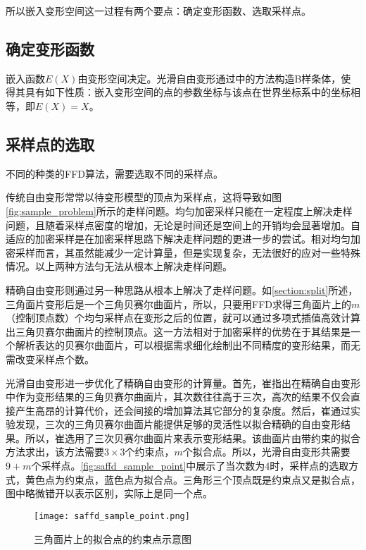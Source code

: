 所以嵌入变形空间这一过程有两个要点：确定变形函数、选取采样点。

\subsection{确定变形函数}
嵌入函数$E(X)$由变形空间决定。光滑自由变形通过\cite{Feng02}中的方法构造B样条体，使得其具有如下性质：嵌入变形空间的点的参数坐标与该点在世界坐标系中的坐标相等，即$E(X)=X$。

\subsection{采样点的选取}
不同的种类的FFD算法，需要选取不同的采样点。

传统自由变形常常以待变形模型的顶点为采样点，这将导致如图\autoref{fig:sample_problem}所示的走样问题。均匀加密采样只能在一定程度上解决走样问题，且随着采样点密度的增加，无论是时间还是空间上的开销均会显著增加。自适应的加密采样是在加密采样思路下解决走样问题的更进一步的尝试。相对均匀加密采样而言，其虽然能减少一定计算量，但是实现复杂，无法很好的应对一些特殊情况。以上两种方法匀无法从根本上解决走样问题。

精确自由变形\cite{Feng00}则通过另一种思路从根本上解决了走样问题。如\ref{section:split}所述，三角面片变形后是一个三角贝赛尔曲面片，所以，只要用FFD求得三角面片上的$m$（控制顶点数）个均匀采样点在变形之后的位置，就可以通过多项式插值高效计算出三角贝赛尔曲面片的控制顶点。这一方法相对于加密采样的优势在于其结果是一个解析表达的贝赛尔曲面片，可以根据需求细化绘制出不同精度的变形结果，而无需改变采样点个数。

光滑自由变形\cite{Cui15}进一步优化了精确自由变形的计算量。首先，崔指出在精确自由变形中作为变形结果的三角贝赛尔曲面片，其次数往往高于三次，高次的结果不仅会直接产生高昂的计算代价，还会间接的增加算法其它部分的复杂度。然后，崔通过实验发现，三次的三角贝赛尔曲面片能提供足够的灵活性以拟合精确的自由变形结果。所以，崔选用了三次贝赛尔曲面片来表示变形结果。该曲面片由带约束的拟合方法求出，该方法需要$3\times3$个约束点，$m$个拟合点。所以，光滑自由变形共需要$9+m$个采样点。\autoref{fig:saffd_sample_point}中展示了当次数为4时，采样点的选取方式，黄色点为约束点，蓝色点为拟合点。三角形三个顶点既是约束点又是拟合点，图中略微错开以表示区别，实际上是同一个点。

\begin{figure}[htbp]
	\centering
	\texttt{[image: saffd\_sample\_point.png]}
    \caption{三角面片上的拟合点的约束点示意图}\label{fig:saffd_sample_point}
\end{figure}


